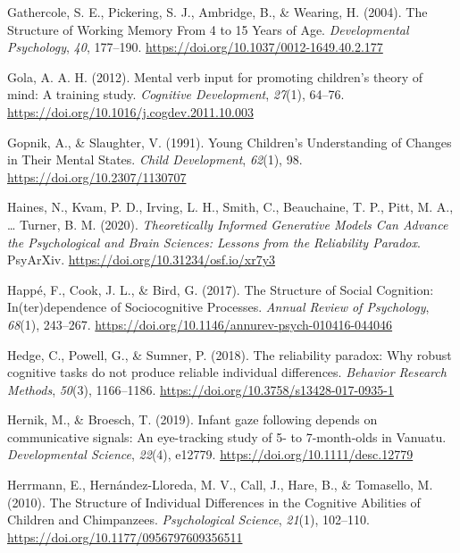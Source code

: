 \documentclass[
  man,floatsintext]{apa7}
\newlength{\cslhangindent}
\newlength{\cslentryspacingunit} %
\newenvironment{CSLReferences}[2] %
 {%
  \setlength{\parindent}{0pt}
  \ifodd #1
  \let\oldpar\par
  \def\par{\hangindent=\cslhangindent\oldpar}
  \fi
  \setlength{\parskip}{#2\cslentryspacingunit}
 }%
 {}
\begin{document}
\begin{CSLReferences}{1}{0}
\leavevmode{}%
Gathercole, S. E., Pickering, S. J., Ambridge, B., \& Wearing, H. (2004). The {Structure} of {Working Memory From} 4 to 15 {Years} of {Age}. \emph{Developmental Psychology}, \emph{40}, 177--190. \url{https://doi.org/10.1037/0012-1649.40.2.177}

\leavevmode{}%
Gola, A. A. H. (2012). Mental verb input for promoting children's theory of mind: {A} training study. \emph{Cognitive Development}, \emph{27}(1), 64--76. \url{https://doi.org/10.1016/j.cogdev.2011.10.003}

\leavevmode{}%
Gopnik, A., \& Slaughter, V. (1991). Young {Children}'s {Understanding} of {Changes} in {Their Mental States}. \emph{Child Development}, \emph{62}(1), 98. \url{https://doi.org/10.2307/1130707}

\leavevmode{}%
Haines, N., Kvam, P. D., Irving, L. H., Smith, C., Beauchaine, T. P., Pitt, M. A., \ldots{} Turner, B. M. (2020). \emph{Theoretically {Informed Generative Models Can Advance} the {Psychological} and {Brain Sciences}: {Lessons} from the {Reliability Paradox}}. {PsyArXiv}. \url{https://doi.org/10.31234/osf.io/xr7y3}

\leavevmode{}%
Happé, F., Cook, J. L., \& Bird, G. (2017). The {Structure} of {Social Cognition}: {In}(ter)dependence of {Sociocognitive Processes}. \emph{Annual Review of Psychology}, \emph{68}(1), 243--267. \url{https://doi.org/10.1146/annurev-psych-010416-044046}

\leavevmode{}%
Hedge, C., Powell, G., \& Sumner, P. (2018). The reliability paradox: {Why} robust cognitive tasks do not produce reliable individual differences. \emph{Behavior Research Methods}, \emph{50}(3), 1166--1186. \url{https://doi.org/10.3758/s13428-017-0935-1}

\leavevmode{}%
Hernik, M., \& Broesch, T. (2019). Infant gaze following depends on communicative signals: {An} eye-tracking study of 5- to 7-month-olds in {Vanuatu}. \emph{Developmental Science}, \emph{22}(4), e12779. \url{https://doi.org/10.1111/desc.12779}

\leavevmode{}%
Herrmann, E., Hernández-Lloreda, M. V., Call, J., Hare, B., \& Tomasello, M. (2010). The {Structure} of {Individual Differences} in the {Cognitive Abilities} of {Children} and {Chimpanzees}. \emph{Psychological Science}, \emph{21}(1), 102--110. \url{https://doi.org/10.1177/0956797609356511}


\end{CSLReferences}
\end{document}
